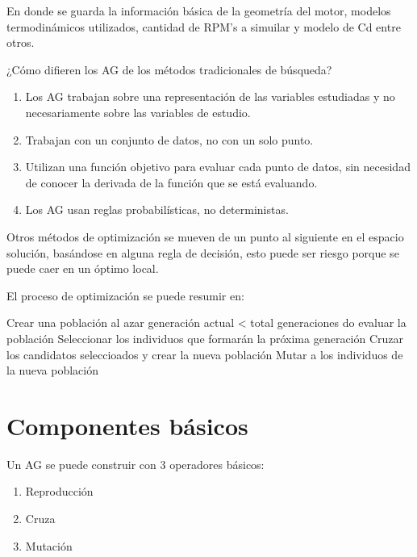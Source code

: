 En donde se guarda la información básica de la geometría del motor, modelos
termodinámicos utilizados, cantidad de RPM's a simuilar y modelo de Cd entre
otros.


¿Cómo difieren los AG de los métodos tradicionales de búsqueda?
%
\begin{enumerate}
  \item Los AG trabajan sobre una representación de las variables estudiadas y
      no necesariamente sobre las variables de estudio.
    \item Trabajan con un conjunto de datos, no con un solo punto.
    \item Utilizan una función objetivo para evaluar cada punto de datos, sin
        necesidad de conocer la derivada de la función que se está evaluando.
    \item Los AG usan reglas probabilísticas, no deterministas.
\end{enumerate}


Otros métodos de optimización se mueven de un punto al siguiente en el espacio
solución, basándose en alguna regla de decisión, esto puede ser riesgo porque
se puede caer en un óptimo local.

El proceso de optimización se puede resumir en:

Crear una población al azar
generación actual < total generaciones do
evaluar la población
Seleccionar los individuos que formarán la próxima generación
Cruzar los candidatos seleccioados y crear la nueva población
Mutar a los individuos de la nueva población


\section{Componentes básicos}
%
Un AG se puede construir con 3 operadores básicos:
\begin{enumerate}
    \item Reproducción
    \item Cruza
    \item Mutación
\end{enumerate}

